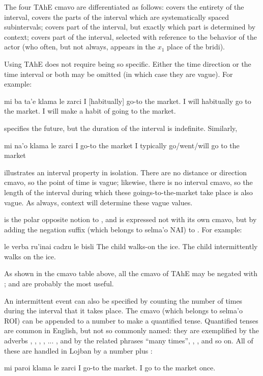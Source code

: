 The four TAhE cmavo are differentiated as follows: 
    covers the entirety of the interval,  covers the parts
    of the interval which are systematically spaced subintervals;
     covers part of the interval, but exactly which part is
    determined by context;  covers part of the interval,
    selected with reference to the behavior of the actor (who
    often, but not always, appears in the $x_1$ place of the bridi). 

Using TAhE does not require being so specific. Either the
    time direction or the time interval or both may be omitted (in
    which case they are vague). For example:
\begin{example}
mi ba ta'e klama le zarci\n
I  [habitually] go-to the market.\n
I will habitually go to the market.\n
I will make a habit of going to the market.
\end{example}

{\noindent}specifies the future, but the duration of the interval is
    indefinite. Similarly,
\begin{example}
mi na'o klama le zarci\n
I  go-to the market\n
I typically go/went/will go to the market
\end{example}

{\noindent}illustrates an interval property in isolation. There are no
    distance or direction cmavo, so the point of time is vague;
    likewise, there is no interval cmavo, so the length of the
    interval during which these goings-to-the-market take place is
    also vague. As always, context will determine these vague
    values. 

 is the polar opposite notion to
    , and is expressed not with its own cmavo, but
    by adding the negation suffix  (which belongs to
    selma'o NAI) to . For example:
\begin{example}
le verba ru'inai cadzu le bisli\n
The child  walks-on the ice.\n
The child intermittently walks on the ice.
\end{example}

As shown in the cmavo table above, all the cmavo of TAhE may be
    negated with ;  and  are probably
    the most useful. 

An intermittent event can also be specified by counting the
    number of times during the interval that it takes place. The
    cmavo  (which belongs to selma'o ROI) can be appended to
    a number to make a quantified tense. Quantified tenses are
    common in English, but not so commonly named: they are
    exemplified by the adverbs , , ,
    , ... , and by the related phrases ``many
    times'', , , and so on. All of
    these are handled in Lojban by a number plus :
\begin{example}
mi paroi klama le zarci\n
I  go-to the market.\n
I go to the market once.
\end{example}

